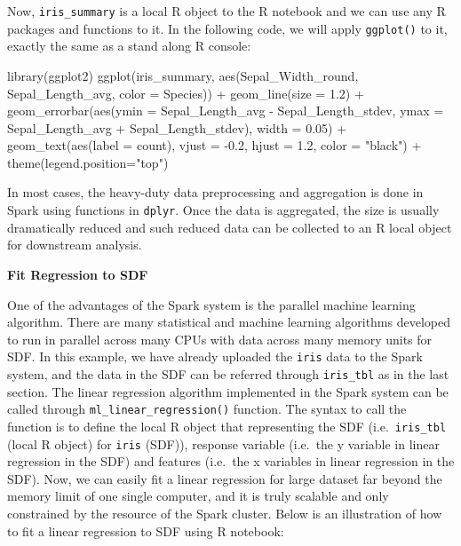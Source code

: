 \documentclass[
  12pt,
]{krantz}
\makeatletter
\newenvironment{Shaded}{\begin{snugshade}}{\end{snugshade}}
\newcommand{\AttributeTok}[1]{\textcolor[rgb]{0.61,0.61,0.61}{#1}}
\newcommand{\FloatTok}[1]{\textcolor[rgb]{0.06,0.06,0.06}{#1}}
\newcommand{\FunctionTok}[1]{\textcolor[rgb]{0,0,0}{#1}}
\newcommand{\NormalTok}[1]{#1}
\newcommand{\SpecialCharTok}[1]{\textcolor[rgb]{0,0,0}{#1}}
\newcommand{\StringTok}[1]{\textcolor[rgb]{0.5,0.5,0.5}{#1}}
\newenvironment{kframe}{%
\medskip{}
\setlength{\fboxsep}{.8em}
 \def\at@end@of@kframe{}%
 \ifinner\ifhmode%
  \def\at@end@of@kframe{\end{minipage}}%
  \begin{minipage}{\columnwidth}%
 \fi\fi%
 \def\FrameCommand##1{\hskip\@totalleftmargin \hskip-\fboxsep
 \colorbox{shadecolor}{##1}\hskip-\fboxsep
     \hskip-\linewidth \hskip-\@totalleftmargin \hskip\columnwidth}%
 \MakeFramed {\advance\hsize-\width
   \@totalleftmargin\z@ \linewidth\hsize
   \@setminipage}}%
 {\par\unskip\endMakeFramed%
 \at@end@of@kframe}
\renewenvironment{Shaded}{\begin{kframe}}{\end{kframe}}
\makeatother
\begin{document}
Now, \texttt{iris\_summary} is a local R object to the R notebook and we can use any R packages and functions to it. In the following code, we will apply \texttt{ggplot()} to it, exactly the same as a stand along R console:

\begin{Shaded}
\begin{Highlighting}[]
\FunctionTok{library}\NormalTok{(ggplot2)}
\FunctionTok{ggplot}\NormalTok{(iris\_summary, }\FunctionTok{aes}\NormalTok{(Sepal\_Width\_round, }
\NormalTok{                         Sepal\_Length\_avg, }
                         \AttributeTok{color =}\NormalTok{ Species)) }\SpecialCharTok{+}
    \FunctionTok{geom\_line}\NormalTok{(}\AttributeTok{size =} \FloatTok{1.2}\NormalTok{) }\SpecialCharTok{+}
    \FunctionTok{geom\_errorbar}\NormalTok{(}\FunctionTok{aes}\NormalTok{(}\AttributeTok{ymin =}\NormalTok{ Sepal\_Length\_avg }\SpecialCharTok{{-}}\NormalTok{ Sepal\_Length\_stdev, }
                      \AttributeTok{ymax =}\NormalTok{ Sepal\_Length\_avg }\SpecialCharTok{+}\NormalTok{ Sepal\_Length\_stdev),}
                      \AttributeTok{width =} \FloatTok{0.05}\NormalTok{) }\SpecialCharTok{+}
    \FunctionTok{geom\_text}\NormalTok{(}\FunctionTok{aes}\NormalTok{(}\AttributeTok{label =}\NormalTok{ count), }
              \AttributeTok{vjust =} \SpecialCharTok{{-}}\FloatTok{0.2}\NormalTok{, }
              \AttributeTok{hjust =} \FloatTok{1.2}\NormalTok{,}
              \AttributeTok{color =} \StringTok{"black"}\NormalTok{) }\SpecialCharTok{+}
\FunctionTok{theme}\NormalTok{(}\AttributeTok{legend.position=}\StringTok{"top"}\NormalTok{)}
\end{Highlighting}
\end{Shaded}

In most cases, the heavy-duty data preprocessing and aggregation is done in Spark using functions in \texttt{dplyr}. Once the data is aggregated, the size is usually dramatically reduced and such reduced data can be collected to an R local object for downstream analysis.

\textbf{Fit Regression to SDF}

One of the advantages of the Spark system is the parallel machine learning algorithm. There are many statistical and machine learning algorithms developed to run in parallel across many CPUs with data across many memory units for SDF. In this example, we have already uploaded the \texttt{iris} data to the Spark system, and the data in the SDF can be referred through \texttt{iris\_tbl} as in the last section. The linear regression algorithm implemented in the Spark system can be called through \texttt{ml\_linear\_regression()} function. The syntax to call the function is to define the local R object that representing the SDF (i.e.~\texttt{iris\_tbl} (local R object) for \texttt{iris} (SDF)), response variable (i.e.~the y variable in linear regression in the SDF) and features (i.e.~the x variables in linear regression in the SDF). Now, we can easily fit a linear regression for large dataset far beyond the memory limit of one single computer, and it is truly scalable and only constrained by the resource of the Spark cluster. Below is an illustration of how to fit a linear regression to SDF using R notebook:
\end{document}
